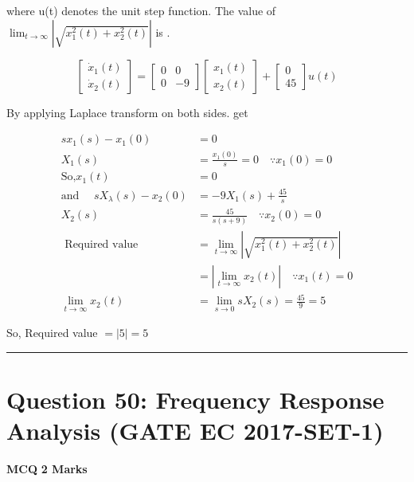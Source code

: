 \documentclass[11pt,a4paper]{article}
\begin{document}
 where u(t) denotes the unit step function. The value of  $\lim_{t\rightarrow \infty }|\sqrt{x_{1}^{2}(t)+x_{2}^{2}(t)}|$  is \underline{\hspace{1.5cm}}.


\begin{tcolorbox}[solbox, title=Detailed Solution -- Question 49]
\[
\left[\begin{array}{l} \dot{x}_{1}(t) \\ \dot{x}_{2}(t) \end{array}\right]=\left[\begin{array}{cc} 0 & 0 \\ 0 & -9 \end{array}\right]\left[\begin{array}{l} x_{1}(t) \\ x_{2}(t) \end{array}\right]+\left[\begin{array}{c} 0 \\ 45 \end{array}\right] u(t)
\]

 By applying Laplace transform on both sides. get

\[
\begin{aligned} s x_{1}(s)-x_{1}(0)&=0\\ X_{1}(s)&=\frac{x_{1}(0)}{s}=0 \quad \because x_{1}(0)=0 \\ \text{So,} x_{1}(t)&=0 \\ \text{and }\quad s X_{\lambda}(s)-x_{2}(0)&=-9 X_{1}(s)+\frac{45}{s} \\ X_{2}(s) &=\frac{45}{s(s+9)} \quad \because x_{2}(0)=0 \\ \text { Required value } &=\lim _{t \rightarrow \infty}|\sqrt{x_{1}^{2}(t)+x_{2}^{2}(t)}| \\ &=\left|\lim _{t \rightarrow \infty} x_{2}(t)\right| \quad \because x_{1}(t)=0 \\ \lim _{t \rightarrow \infty} x_{2}(t) &=\lim _{s \rightarrow 0} s X_{2}(s)=\frac{45}{9}=5 \end{aligned}
\]

 So,
 Required value $= |5| =5$
\end{tcolorbox}

\vspace{1.5em}
\hrule
\vspace{1.5em}

\section*{Question 50: Frequency Response Analysis (GATE EC 2017-SET-1)}
\noindent \textbf{\color{primary}MCQ} \hfill \textbf{\color{secondary}2 Marks}
\end{document}
